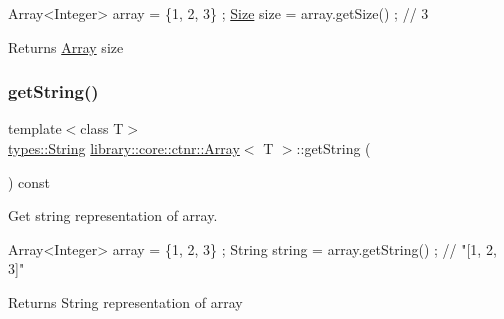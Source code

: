 \begin{DoxyCode}
Array<Integer> array = \{1, 2, 3\} ;
\hyperlink{namespacelibrary_1_1core_1_1types_a701626ea1027888ebbb8cfd0ff7adab0}{Size} size = array.getSize() ; \textcolor{comment}{// 3}
\end{DoxyCode}


\begin{DoxyReturn}{Returns}
\hyperlink{classlibrary_1_1core_1_1ctnr_1_1Array}{Array} size 
\end{DoxyReturn}
\mbox{\label{classlibrary_1_1core_1_1ctnr_1_1Array_a6a3416cc26d2968239af631d946ba11b}} 
\subsubsection{\texorpdfstring{get\+String()}{getString()}}
{\footnotesize\ttfamily template$<$class T$>$ \\
\hyperlink{classlibrary_1_1core_1_1types_1_1String}{types\+::\+String} \hyperlink{classlibrary_1_1core_1_1ctnr_1_1Array}{library\+::core\+::ctnr\+::\+Array}$<$ T $>$\+::get\+String (\begin{DoxyParamCaption}{ }\end{DoxyParamCaption}) const}



Get string representation of array. 


\begin{DoxyCode}
Array<Integer> array = \{1, 2, 3\} ;
String \textcolor{keywordtype}{string} = array.getString() ; \textcolor{comment}{// "[1, 2, 3]"}
\end{DoxyCode}


\begin{DoxyReturn}{Returns}
String representation of array 
\end{DoxyReturn}
\mbox{\label{classlibrary_1_1core_1_1ctnr_1_1Array_a62069b24d593b2265422cb8f3a149c44}} 
